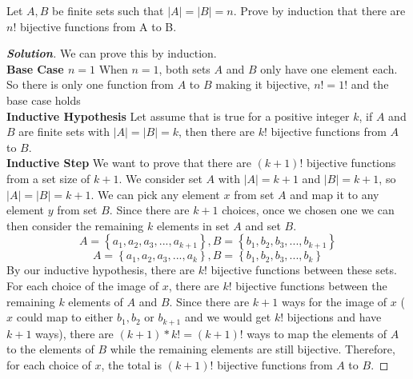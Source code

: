 \documentclass[11pt]{article}
\newenvironment{problem}[2][Problem\!]{\begin{trivlist}
\item[\hskip \labelsep {\bfseries #1}\hskip \labelsep {\bfseries #2.}]}{\end{trivlist}}
\newenvironment{solution}{\begin{proof}[\textbf{\textit{Solution}}]}{\end{proof}}
\newcommand{\set}[1]{\left\{#1\right\}} %
\begin{document}
\begin{problem}{8.2}
Let \(A, B \) be finite sets such that \(|A| = |B| = n\). Prove by induction that there are \(n!\) bijective functions from A to B.
\begin{solution}
We can prove this by induction.\\
\textbf{Base Case \(n = 1\)} When \(n = 1\), both sets \(A\) and \(B\) only have one element each. So there is only one function from \(A\) to \(B\) making it bijective, \(n! = 1!\) and the base case holds\\
\textbf{Inductive Hypothesis} Let assume that is true for a positive integer \(k\), if \(A\) and \(B\) are finite sets with \(|A| = |B| = k\), then there are \(k!\) bijective functions from \(A\) to \(B\).\\
\textbf{Inductive Step} We want to prove that there are \((k+1)!\) bijective functions from a set size of \(k+1\). We consider set \(A\) with \(|A| = k+1\) and \(|B| = k+1\), so \(|A| = |B| = k+1\). We can pick any element \(x\) from set \(A\) and map it to any element \(y\) from set \(B\). Since there are \(k+1\) choices, once we chosen one we can then consider the remaining \(k\) elements in set \(A\) and set \(B\).
\[A = \set{a_1,a_2,a_3,...,a_{k+1}}, B = \set{b_1,b_2,b_3,...,b_{k+1}}\]
\[A = \set{a_1,a_2,a_3,...,a_{k}}, B = \set{b_1,b_2,b_3,...,b_{k}}\]
By our inductive hypothesis, there are \(k!\) bijective functions between these sets. For each choice of the image of \(x\), there are \(k!\) bijective functions between the remaining \(k\) elements of \(A\) and \(B\). Since there are \(k+1\) ways for the image of \(x\) (\(x\) could map to either \(b_1,b_2 \text{ or } b_{k+1}\) and we would get \(k!\) bijections and have \(k+1\) ways), there are \((k+1)*k! = (k+1)!\) ways to map the elements of \(A\) to the elements of \(B\) while the remaining elements are still bijective. Therefore, for each choice of \(x\), the total is \((k+1)!\) bijective functions from \(A\) to \(B\).
\end{solution}

\end{problem}

\newpage %
\end{document}
